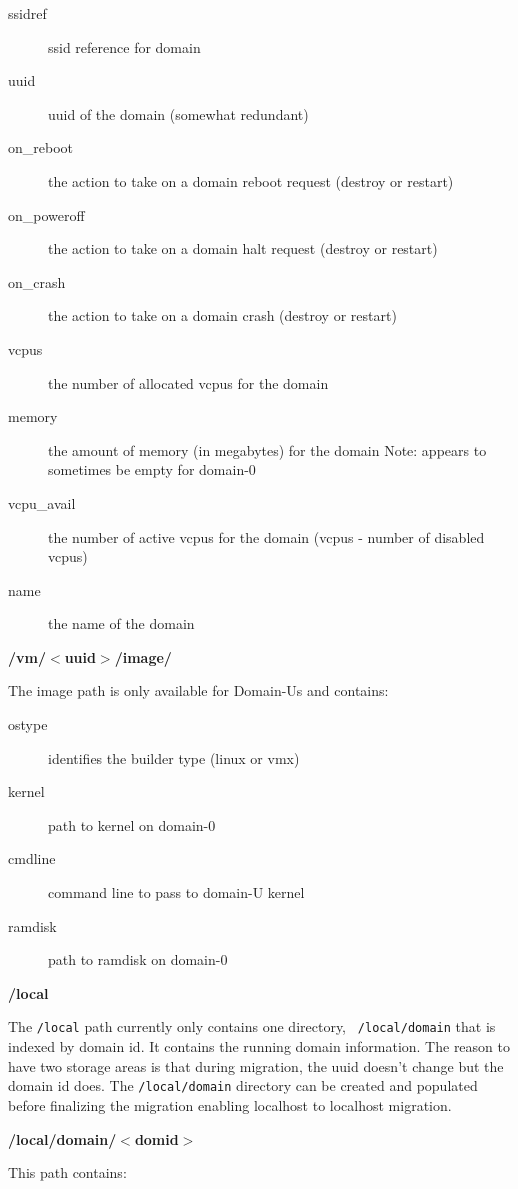 \documentclass[11pt,twoside,final,openright]{report}
\begin{document}
\begin{description}
\item[ssidref] ssid reference for domain
\item[uuid] uuid of the domain (somewhat redundant)
\item[on\_reboot] the action to take on a domain reboot request (destroy or restart)
\item[on\_poweroff] the action to take on a domain halt request (destroy or restart)
\item[on\_crash] the action to take on a domain crash (destroy or restart)
\item[vcpus] the number of allocated vcpus for the domain
\item[memory] the amount of memory (in megabytes) for the domain Note: appears to sometimes be empty for domain-0
\item[vcpu\_avail] the number of active vcpus for the domain (vcpus - number of disabled vcpus)
\item[name] the name of the domain
\end{description}


{\bf /vm/$<$uuid$>$/image/}

The image path is only available for Domain-Us and contains:
\begin{description}
\item[ostype] identifies the builder type (linux or vmx)
\item[kernel] path to kernel on domain-0
\item[cmdline] command line to pass to domain-U kernel
\item[ramdisk] path to ramdisk on domain-0
\end{description}

{\bf /local}

The {\tt /local} path currently only contains one directory, {\tt
/local/domain} that is indexed by domain id.  It contains the running
domain information.  The reason to have two storage areas is that
during migration, the uuid doesn't change but the domain id does.  The
{\tt /local/domain} directory can be created and populated before
finalizing the migration enabling localhost to localhost migration.

{\bf /local/domain/$<$domid$>$}

This path contains:
\end{document}

